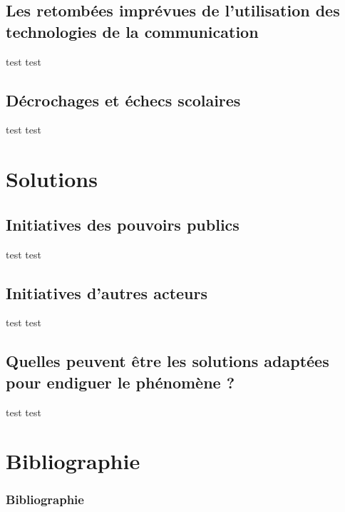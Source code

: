 \documentclass[utf8]{beamer}
\begin{document}
\subsection{Les retombées imprévues de l'utilisation des technologies de la communication}

\begin{frame}{test}
test
\end{frame}

\subsection{Décrochages et échecs scolaires}

\begin{frame}{test}
test
\end{frame}



\section{Solutions}

\subsection{Initiatives des pouvoirs publics}

\begin{frame}{test}
test
\end{frame}

\subsection{Initiatives d'autres acteurs}

\begin{frame}{test}
test
\end{frame}

\subsection{Quelles peuvent être les solutions adaptées pour endiguer le phénomène ?}

\begin{frame}{test}
test
\end{frame}



\section{Bibliographie}

\begin{frame}[allowframebreaks]
\frametitle{Bibliographie}

\end{frame}
\end{document}
